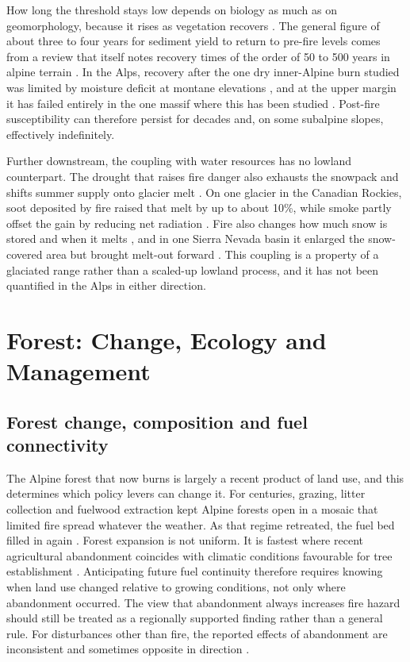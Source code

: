 \documentclass[11pt,a4paper]{article}
\begin{document}
How long the threshold stays low depends on biology as much as on geomorphology, because it rises as vegetation recovers \citep{rengers_evaluating_2024}. The general figure of about three to four years for sediment yield to return to pre-fire levels comes from a review that itself notes recovery times of the order of 50 to 500 years in alpine terrain \citep{santi_wildfire_2022}. In the Alps, recovery after the one dry inner-Alpine burn studied was limited by moisture deficit at montane elevations \citep{moser_potential_2010}, and at the upper margin it has failed entirely in the one massif where this has been studied \citep{degiuli_arrested_2024}. Post-fire susceptibility can therefore persist for decades \citep{gehring_shallow_2019} and, on some subalpine slopes, effectively indefinitely.

Further downstream, the coupling with water resources has no lowland counterpart. The drought that raises fire danger also exhausts the snowpack and shifts summer supply onto glacier melt \citep{leone_20222023_2026}. On one glacier in the Canadian Rockies, soot deposited by fire raised that melt by up to about 10\%, while smoke partly offset the gain by reducing net radiation \citep{aubrywake_fire_2022}. Fire also changes how much snow is stored and when it melts \citep{koshkin_wildfire_2022}, and in one Sierra Nevada basin it enlarged the snow-covered area but brought melt-out forward \citep{micheletty_application_2014}. This coupling is a property of a glaciated range rather than a scaled-up lowland process, and it has not been quantified in the Alps in either direction.

\section{Forest: Change, Ecology and Management}
\label{sec:forest}

\subsection{Forest change, composition and fuel connectivity}

The Alpine forest that now burns is largely a recent product of land use, and this determines which policy levers can change it. For centuries, grazing, litter collection and fuelwood extraction kept Alpine forests open in a mosaic that limited fire spread whatever the weather. As that regime retreated, the fuel bed filled in again \citep{bebi_changes_2017}. Forest expansion is not uniform. It is fastest where recent agricultural abandonment coincides with climatic conditions favourable for tree establishment \citep{garbarino_contrasting_2020}. Anticipating future fuel continuity therefore requires knowing when land use changed relative to growing conditions, not only where abandonment occurred. The view that abandonment always increases fire hazard should still be treated as a regionally supported finding rather than a general rule. For disturbances other than fire, the reported effects of abandonment are inconsistent and sometimes opposite in direction \citep{mantero_influence_2020}.
\end{document}

